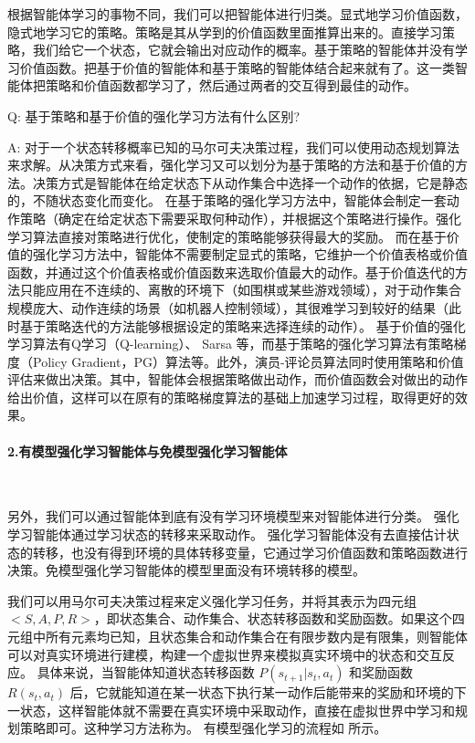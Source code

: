 根据智能体学习的事物不同，我们可以把智能体进行归类。显式地学习价值函数，隐式地学习它的策略。策略是其从学到的价值函数里面推算出来的。直接学习策略，我们给它一个状态，它就会输出对应动作的概率。基于策略的智能体并没有学习价值函数。把基于价值的智能体和基于策略的智能体结合起来就有了。这一类智能体把策略和价值函数都学习了，然后通过两者的交互得到最佳的动作。

Q: 基于策略和基于价值的强化学习方法有什么区别?

A: 对于一个状态转移概率已知的马尔可夫决策过程，我们可以使用动态规划算法来求解。从决策方式来看，强化学习又可以划分为基于策略的方法和基于价值的方法。决策方式是智能体在给定状态下从动作集合中选择一个动作的依据，它是静态的，不随状态变化而变化。
在基于策略的强化学习方法中，智能体会制定一套动作策略（确定在给定状态下需要采取何种动作），并根据这个策略进行操作。强化学习算法直接对策略进行优化，使制定的策略能够获得最大的奖励。
而在基于价值的强化学习方法中，智能体不需要制定显式的策略，它维护一个价值表格或价值函数，并通过这个价值表格或价值函数来选取价值最大的动作。基于价值迭代的方法只能应用在不连续的、离散的环境下（如围棋或某些游戏领域），对于动作集合规模庞大、动作连续的场景（如机器人控制领域），其很难学习到较好的结果（此时基于策略迭代的方法能够根据设定的策略来选择连续的动作）。
基于价值的强化学习算法有Q学习（Q-learning）、 Sarsa 等，而基于策略的强化学习算法有策略梯度（Policy Gradient，PG）算法等。此外，演员-评论员算法同时使用策略和价值评估来做出决策。其中，智能体会根据策略做出动作，而价值函数会对做出的动作给出价值，这样可以在原有的策略梯度算法的基础上加速学习过程，取得更好的效果。

\paragraph{2.有模型强化学习智能体与免模型强化学习智能体}~{}
\newline

另外，我们可以通过智能体到底有没有学习环境模型来对智能体进行分类。
 强化学习智能体通过学习状态的转移来采取动作。
 强化学习智能体没有去直接估计状态的转移，也没有得到环境的具体转移变量，它通过学习价值函数和策略函数进行决策。免模型强化学习智能体的模型里面没有环境转移的模型。

我们可以用马尔可夫决策过程来定义强化学习任务，并将其表示为四元组 $<S,A,P,R>$，即状态集合、动作集合、状态转移函数和奖励函数。如果这个四元组中所有元素均已知，且状态集合和动作集合在有限步数内是有限集，则智能体可以对真实环境进行建模，构建一个虚拟世界来模拟真实环境中的状态和交互反应。
具体来说，当智能体知道状态转移函数 $P(s_{t+1}|s_t,a_t)$ 和奖励函数 $R(s_t,a_t)$ 后，它就能知道在某一状态下执行某一动作后能带来的奖励和环境的下一状态，这样智能体就不需要在真实环境中采取动作，直接在虚拟世界中学习和规划策略即可。这种学习方法称为。
有模型强化学习的流程如 所示。

